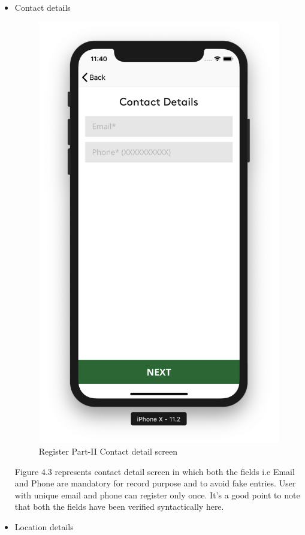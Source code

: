 \begin{itemize}
    \newpage
    
    \item Contact details
    
    \begin{figure}[H]
            \centering
            \includegraphics[width=0.5\linewidth]{figures/ch2/register_contact.png}
            \caption{\label{fig:wireframe_3} Register Part-II Contact detail screen}
    \end{figure}
    
    Figure 4.3 represents contact detail screen in which both the fields i.e Email and Phone are mandatory for record purpose and to avoid fake entries. User with unique email and phone can register only once. It's a good point to note that both the fields have been verified syntactically here.
    
    \newpage
  
    \item Location details
    

\end{itemize}
